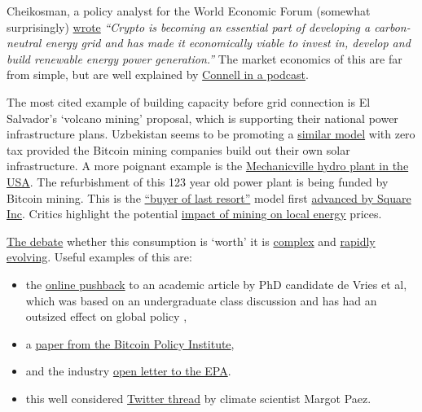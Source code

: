 Cheikosman, a policy analyst for the World Economic Forum (somewhat surprisingly) \href{https://www.weforum.org/agenda/2022/03/crypto-energy-consumption/?}{wrote} \textit{``Crypto is becoming an essential part of developing a carbon-neutral energy grid and has made it economically viable to invest in, develop and build renewable energy power generation.''} 
The market economics of this are far from simple, but are well explained by \href{https://www.whatbitcoindid.com/podcast/bitcoin-energy-markets}{Connell in a podcast}.\par
The most cited example of building capacity before grid connection is El Salvador's `volcano mining' proposal, which is supporting their national power infrastructure plans. Uzbekistan seems to be promoting a \href{https://www.reuters.com/business/finance/uzbekistan-legalises-solar-powered-crypto-mining-2022-05-04/}{similar model} with zero tax provided the Bitcoin mining companies build out their own solar infrastructure. A more poignant example is the \href{https://www.timesunion.com/news/article/Mechanicville-hydro-plant-gets-new-life-16299115.php}{Mechanicville hydro plant in the USA}. The refurbishment of this 123 year old power plant is being funded by Bitcoin mining. This is the \href{https://www.lynalden.com/bitcoin-energy/}{``buyer of last resort''} model first \href{https://squareup.com/us/en/press/bcei-white-paper}{advanced by Square Inc}. Critics highlight the potential \href{https://www.fitchratings.com/research/us-public-finance/crypto-mining-poses-challenges-to-public-power-utilities-24-01-2022}{impact of mining on local energy} prices\cite{benetton2021cryptomining}.\par
\href{https://www.youtube.com/watch?v=6LP8G-oZnEs}{The debate} whether this consumption is `worth' it is \href{https://www.utilitydive.com/news/bitcoin-mining-as-a-grid-resource-its-complicated/617896/}{complex} and \href{https://www.aei.org/technology-and-innovation/no-hearing-on-bitcoins-energy-use-is-complete-without-nic-carter/}{rapidly evolving}. Useful examples of this are:
\begin{itemize}
\item the \href{https://www.zerohedge.com/crypto/questionable-ethics-anti-bitcoin-esg-junk-science}{online pushback} to an academic article by PhD candidate de Vries et al, which was based on an undergraduate class discussion and has had an outsized effect on global policy \cite{de2022revisiting}, 
\item a \href{https://rebrand.ly/v8qq1sx}{paper from the Bitcoin Policy Institute}, 
\item and the industry \href{https://bitcoinminingcouncil.com/wp-content/uploads/2022/05/Bitcoin_Letter_to_the_Environmental_Protection_Agency.pdf}{open letter to the EPA}.\par
\item this well considered \href{https://twitter.com/jyn_urso/status/1508899761319038983}{Twitter thread} by climate scientist Margot Paez.
\end{itemize}
